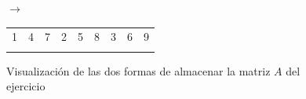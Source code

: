 \documentclass[a4paper]{report}
\begin{document}
\begin{figure}[h]
{        $\rightarrow$

        \begin{tabular}{!{\vrule width 1.5pt}>{}c|>{}c|>{}c!{\vrule width 1.5pt}>{}c|>{}c|>{}c!{\vrule width 1.5pt}>{}c|>{}c|>{}c!{\vrule width 1.5pt}}
            1 & 4 & 7 & 2 & 5 & 8 & 3 & 6 & 9 \\
        \end{tabular}
    }
    \caption{Visualización de las dos formas de almacenar la matriz $A$ del ejercicio}
\end{figure}
\end{document}
